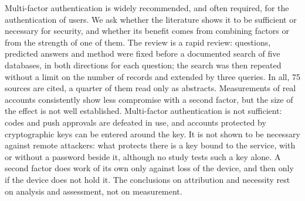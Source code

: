Multi-factor authentication is widely recommended, and often required,
for the authentication of users.
We ask whether the literature shows it to be sufficient or necessary
for security, and whether its benefit comes from combining factors or
from the strength of one of them.
The review is a rapid review: questions, predicted answers and method
were fixed before a documented search of five databases, in both
directions for each question; the search was then repeated without a
limit on the number of records and extended by three queries.
In all, 75 sources are cited, a quarter of them read only as
abstracts.
Measurements of real accounts consistently show less compromise with a
second factor, but the size of the effect is not well established.
Multi-factor authentication is not sufficient: codes and push
approvals are defeated in use, and accounts protected by cryptographic
keys can be entered around the key.
It is not shown to be necessary against remote attackers: what protects
there is a key bound to the service, with or without a password beside
it, although no study tests such a key alone.
A second factor does work of its own only against loss of the device,
and then only if the device does not hold it.
The conclusions on attribution and necessity rest on analysis and
assessment, not on measurement.
